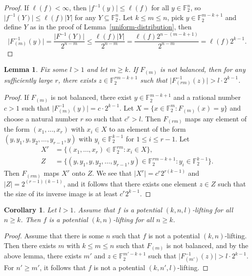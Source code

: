 \documentclass[11pt,english,a4paper]{amsart}
\theoremstyle{plain}
\newtheorem{lemma}[theorem]{Lemma}
\newtheorem{corollary}[theorem]{Corollary}
\theoremstyle{definition}
\theoremstyle{remark}
\newcommand{\F}{\mathbb{F}}
\begin{document}
	\begin{proof}
		If $\ell(f)<\infty$,
		then $\lvert f^{-1}(y)\rvert \leq\ell(f)$ for all $y\in\F_2^n$,
		so $\lvert f^{-1}(Y)\rvert \leq\ell(f)\lvert Y\rvert$ for any $Y\subseteq\F_2^n$.
		Let $k\leq m\leq n$, pick $y\in\F_2^{m-k+1}$ and define $Y$ as in the proof of Lemma~\ref{uniform-distribution}, then
		\[
		\lvert F_{(m)}^{-1}(y)\rvert=\frac{\lvert F^{-1}(Y)\rvert}{2^{n-m}} \leq \frac{\ell(f) \lvert Y\rvert}{2^{n-m}}=\frac{\ell(f) 2^{n-(m-k+1)}}{2^{n-m}}=\ell(f)2^{k-1}.
		\]
	\end{proof}
	
	\begin{lemma}
		Fix some $l>1$ and let $m\geq k$.
		If $F_{(m)}$ is not balanced, then for any sufficiently large $r$, there exists $z \in \F_2^{rm-k+1}$ such that $\lvert F_{(rm)}^{-1}(z)\rvert>l\cdot 2^{k-1}$.
	\end{lemma}
	
	\begin{proof}
		If $F_{(m)}$ is not balanced,
		there exist $y \in \F_2^{m-k+1}$ and a rational number $c>1$ such that $\lvert F_{(m)}^{-1}(y) \rvert = c \cdot 2^{k-1}$.
		Let $X = \{ x \in \F_2^m \colon F_{(m)}(x) = y\}$ and choose a natural number $r$ so such that $c^r>l$. Then $F_{(rm)}$ maps any element of the form $(x_1, \dotsc, x_r)$ with $x_i \in X$ to an element of the form $(y, y_1, y, y_2, \dotsc, y_{r-1}, y)$ with $y_i \in \F_2^{k-1}$ for $1\leq i\leq r-1$. Let
		\[
		\begin{split}
			X^r &= \{ (x_1, \dotsc, x_r) \in\F_2^{rm} : x_i \in X\}, \\
			Z &= \{ (y, y_1, y, y_2, \dotsc, y_{r-1}, y) \in\F_2^{rm-k+1} : y_i \in \F_2^{k-1} \}.
		\end{split}
		\]
		Then $F_{(rm)}$ maps $X^r$ onto $Z$.
		We see that $\lvert X^r\rvert = c^r 2^{r(k-1)}$ and $\lvert Z\rvert = 2^{(r-1)(k-1)}$, and it follows that there exists one element $z\in Z$ such that the size of its inverse image is at least $c^r 2^{k-1}$.
	\end{proof}
	
	\begin{corollary}\label{potential-l}
		Let $l>1$.
		Assume that $f$ is a potential $(k, n, l)$-lifting for all $n\geq k$. Then $f$ is a potential $(k, n)$-lifting for all $n\geq k$.
	\end{corollary}
	
	\begin{proof}
		Assume that there is some $n$ such that $f$ is not a potential $(k, n)$-lifting.
		Then there exists $m$ with $k\leq m\leq n$ such that $F_{(m)}$ is not balanced, and by the above lemma, there exists $m'$ and $z \in \F_2^{m'-k+1}$ such that $\lvert F_{(m')}^{-1}(z)\rvert>l\cdot 2^{k-1}$.
		For $n'\geq m'$, it follows that $f$ is not a potential $(k, n',l)$-lifting.
	\end{proof}
	
\end{document}
